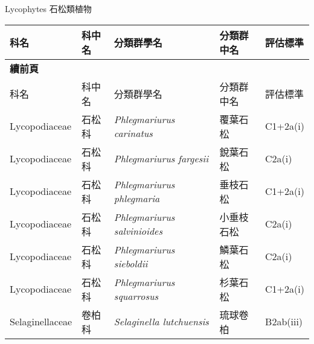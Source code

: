 \noindent\normalfont\selectfont Lycophytes 石松類植物
\footnotesize\selectfont
        {\def\arraystretch{1.5}\tabcolsep=2pt
        \begin{longtable}{p{2.5cm}p{2.5cm}p{4.5cm}p{2.5cm}p{3cm}}
        \toprule
          科名 & 科中名 & 分類群學名 & 分類群中名 & 評估標準 \\
        \midrule 
        \endfirsthead

        {{\bfseries 續前頁 }} \\
        科名 & 科中名 & 分類群學名 & 分類群中名 & 評估標準 \\
        \midrule
        \endhead
                Lycopodiaceae & 石松科 & \textit{Phlegmariurus carinatus}  & 覆葉石松 & C1+2a(i) \index{Phlegmariurus@\textit{Phlegmariurus}!carinatus@\textit{carinatus}}  \index{覆葉石松} \\
    Lycopodiaceae & 石松科 & \textit{Phlegmariurus fargesii}  & 銳葉石松 & C2a(i) \index{Phlegmariurus@\textit{Phlegmariurus}!fargesii@\textit{fargesii}}  \index{銳葉石松} \\
    Lycopodiaceae & 石松科 & \textit{Phlegmariurus phlegmaria}  & 垂枝石松 & C1+2a(i) \index{Phlegmariurus@\textit{Phlegmariurus}!phlegmaria@\textit{phlegmaria}}  \index{垂枝石松} \\
    Lycopodiaceae & 石松科 & \textit{Phlegmariurus salvinioides}  & 小垂枝石松 & C2a(i) \index{Phlegmariurus@\textit{Phlegmariurus}!salvinioides@\textit{salvinioides}}  \index{小垂枝石松} \\
    Lycopodiaceae & 石松科 & \textit{Phlegmariurus sieboldii}  & 鱗葉石松 & C2a(i) \index{Phlegmariurus@\textit{Phlegmariurus}!sieboldii@\textit{sieboldii}}  \index{鱗葉石松} \\
    Lycopodiaceae & 石松科 & \textit{Phlegmariurus squarrosus}  & 杉葉石松 & C1+2a(i) \index{Phlegmariurus@\textit{Phlegmariurus}!squarrosus@\textit{squarrosus}}  \index{杉葉石松} \\
    Selaginellaceae & 卷柏科 & \textit{Selaginella lutchuensis}  & 琉球卷柏 & B2ab(iii) \index{Selaginella@\textit{Selaginella}!lutchuensis@\textit{lutchuensis}}  \index{琉球卷柏} \\
    \bottomrule
        \end{longtable}
        }
    